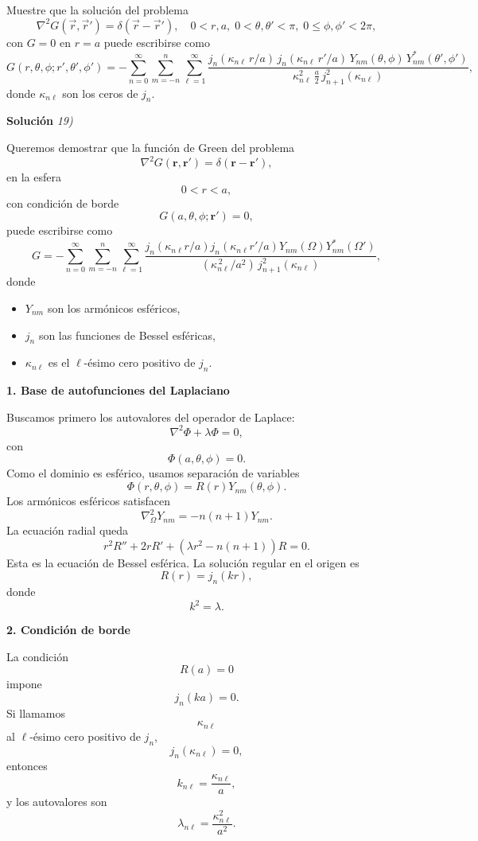 \documentclass[11pt,spanish]{article}
\newcounter{problema}
\newcommand{\prob}{\stepcounter{problema} \vspace{.5cm} \noindent{\bf Problema \arabic{problema}: }}
\begin{document}
\prob Muestre que la solución del problema
\[
\nabla^2 G(\vec{r},\vec{r}') = \delta(\vec{r}-\vec{r}'),\quad 0<r,a,\; 0<\theta,\theta'<\pi,\; 0\le\phi,\phi'<2\pi,
\]
con \(G=0\) en \(r=a\) puede escribirse como
\[
G(r,\theta,\phi;r',\theta',\phi') = -\sum_{n=0}^{\infty}\sum_{m=-n}^{n}\sum_{\ell=1}^{\infty}\frac{j_n(\kappa_{n\ell}\,r/a)\,j_n(\kappa_{n\ell}\,r'/a)\,Y_{nm}(\theta,\phi)\,Y_{nm}^*(\theta',\phi')}{\kappa_{n\ell}^2\,\frac{a}{2}\,j_{n+1}^2(\kappa_{n\ell})},
\]
donde \(\kappa_{n\ell}\) son los ceros de \(j_n\).

\vspace{0.5cm}
{\bf Soluci\'on }{\em 19)}
\vspace{0.5cm}

Queremos demostrar que la función de Green del problema
$$
\nabla^2G(\mathbf r,\mathbf r')
=\delta(\mathbf r-\mathbf r'),
$$
en la esfera
$$
0<r<a,
$$
con condición de borde
$$
G(a,\theta,\phi;\mathbf r')=0,
$$
puede escribirse como
$$
G=
-
\sum_{n=0}^{\infty}
\sum_{m=-n}^{n}
\sum_{\ell=1}^{\infty}
\frac{
j_n(\kappa_{n\ell}r/a)
j_n(\kappa_{n\ell}r'/a)
Y_{nm}(\Omega)
Y_{nm}^{*}(\Omega')
}{
(\kappa_{n\ell}^{\,2}/a^2)
\,j_{n+1}^2(\kappa_{n\ell})
},
$$
donde
\begin{itemize}
\item $Y_{nm}$ son los armónicos esféricos,
\item $j_n$ son las funciones de Bessel esféricas,
\item $\kappa_{n\ell}$ es el $\ell$-ésimo cero positivo de $j_n$.
\end{itemize}

{\bf 1. Base de autofunciones del Laplaciano}

Buscamos primero los autovalores del operador de Laplace:
$$
\nabla^2\Phi+\lambda\Phi=0,
$$
con
$$
\Phi(a,\theta,\phi)=0.
$$
Como el dominio es esférico, usamos separación de variables
$$
\Phi(r,\theta,\phi)
=
R(r)Y_{nm}(\theta,\phi).
$$
Los armónicos esféricos satisfacen
$$
\nabla_\Omega^2Y_{nm}
=
-n(n+1)Y_{nm}.
$$
La ecuación radial queda
$$
r^2R''+2rR'
+
\left(
\lambda r^2-n(n+1)
\right)R=0.
$$
Esta es la ecuación de Bessel esférica.
La solución regular en el origen es
$$
R(r)=j_n(kr),
$$
donde
$$
k^2=\lambda.
$$

{\bf 2. Condición de borde}

La condición
$$
R(a)=0
$$
impone
$$
j_n(ka)=0.
$$
Si llamamos
$$
\kappa_{n\ell}
$$
al $\ell$-ésimo cero positivo de $j_n$,
$$
j_n(\kappa_{n\ell})=0,
$$
entonces
$$
k_{n\ell}
=
\frac{\kappa_{n\ell}}a,
$$
y los autovalores son
$$
\boxed{
\lambda_{n\ell}
=
\frac{\kappa_{n\ell}^2}{a^2}.
}
$$
\end{document}
